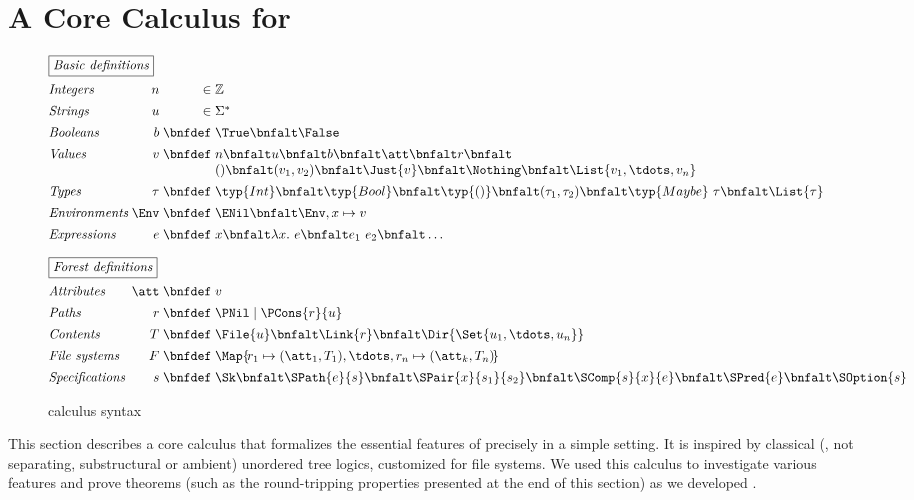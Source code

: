 \section{A Core Calculus for \forest{}}
\label{sec:theory}

\begin{figure}
\[
\begin{array}{@{}l@{\;}r@{\;}r@{\;}l@{}}
\multicolumn{4}{@{}l}{\fbox{\textit{Basic definitions}}}\\[1.5ex]
\textit{Integers}     & n    & \in & \mathbb{Z}\\[1ex]
\textit{Strings}      & u    & \in & \Sigma^{\ast}\\[1ex]
\textit{Booleans}     & b    & \bnfdef & \True \bnfalt \False\\[1ex]
\textit{Values}       & v    & \bnfdef & n \bnfalt u \bnfalt b \bnfalt \att \bnfalt r \bnfalt\\
                      &      &         & () \bnfalt (v_1,v_2) \bnfalt \Just{v} \bnfalt \Nothing \bnfalt \List{v_1,\tdots,v_n}\\[1ex]
\textit{Types}        & \tau & \bnfdef & \typ{Int} \bnfalt \typ{Bool} \bnfalt \typ{()} \bnfalt (\tau_1,\tau_2) \bnfalt \typ{Maybe}~\tau \bnfalt \List{\tau}\\[1ex]
\textit{Environments} & \Env & \bnfdef & \ENil \bnfalt \Env,x\mapsto v\\[1ex]
\textit{Expressions}  & e    & \bnfdef & x \bnfalt \lambda x.~e \bnfalt e_1~e_2 \bnfalt \dots \\[2.5ex]
%
\multicolumn{4}{@{}l}{\fbox{\textit{Forest definitions}}}\\[1.5ex]
\textit{Attributes}     & \att & \bnfdef & v\\[1ex]
\textit{Paths}          & r    & \bnfdef & \PNil \mid \PCons{r}{u}\\[1ex]
\textit{Contents}       & T    & \bnfdef & \File{u} \bnfalt \Link{r} \bnfalt \Dir{ \Set{u_1,\tdots,u_n} }\\[1ex]
\textit{File systems}   & F    & \bnfdef & \Map{ \! r_1 \mapsto (\att_1,T_1), \tdots, r_n \mapsto (\att_k,T_n) \! }\\[1ex]
\textit{Specifications} & s    & \bnfdef & \Sk \bnfalt \SPath{e}{s} \bnfalt \SPair{x}{s_1}{s_2} \bnfalt \SComp{s}{x}{e} \bnfalt \SPred{e} \bnfalt \SOption{s}
\end{array}
\]
\caption{\forest{} calculus syntax}
\label{fig:csyntax}
\end{figure}

This section describes a core calculus that formalizes the essential
features of \forest{} precisely in a simple setting. It is inspired by
classical (\ie{}, not separating, substructural or ambient) unordered
tree logics, customized for file systems. We used this calculus to
investigate various features and prove theorems (such as the
round-tripping properties presented at the end of this section) as we
developed \forest{}.


